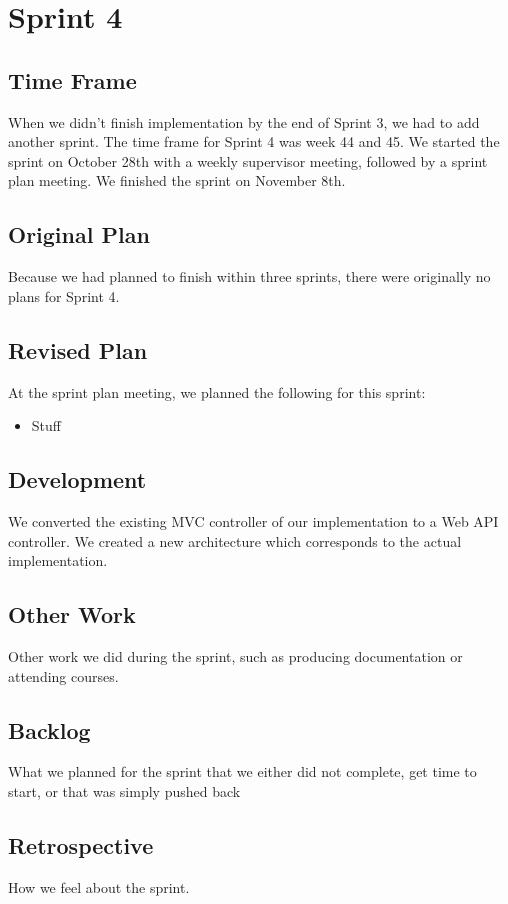 \section{Sprint 4}

\subsection{Time Frame}
When we didn't finish implementation by the end of Sprint 3, we had to add another sprint. The time frame for Sprint 4 was week 44 and 45. We started the sprint on October 28th with a weekly supervisor meeting, followed by a sprint plan meeting. We finished the sprint on November 8th.

\subsection{Original Plan}
Because we had planned to finish within three sprints, there were originally no plans for Sprint 4.

\subsection{Revised Plan}
At the sprint plan meeting, we planned the following for this sprint:
\begin{itemize}
	\item Stuff
\end{itemize}

\subsection{Development}
We converted the existing MVC controller of our implementation to a Web API controller.
We created a new architecture which corresponds to the actual implementation.

\subsection{Other Work}
Other work we did during the sprint, such as producing documentation or attending courses.

\subsection{Backlog}
What we planned for the sprint that we either did not complete, get time to start, or that was simply pushed back

\subsection{Retrospective}
How we feel about the sprint.